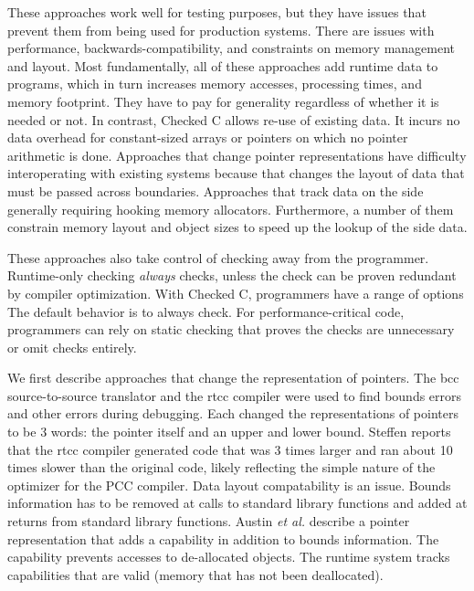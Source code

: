 These approaches work well for testing purposes, but they have issues that
prevent them from being used for production systems.  There are issues
with performance, backwards-compatibility, and constraints on memory
management and layout.  Most fundamentally, all of these approaches add
runtime data to programs, which in turn increases memory accesses, processing 
times, and memory footprint.  They have to pay for generality regardless of
whether it is needed or not. In contrast, Checked C allows re-use of existing data.
It incurs no data overhead for constant-sized arrays or pointers on which no pointer arithmetic is done.   Approaches that change
pointer representations have difficulty interoperating with existing
systems because that changes the layout of data that must be passed
across boundaries.  Approaches that track data on the side generally
requiring hooking memory allocators.  Furthermore, a number of them
constrain memory layout and object sizes to speed up the lookup of
the side data.

These approaches also take control of checking away from the programmer.
Runtime-only checking {\em always} checks, unless the check can be proven 
redundant by compiler optimization.   With Checked C, programmers have
a range of options   The default behavior is to always check. For performance-critical
code, programmers can rely on static checking that proves the checks
are unnecessary or omit checks entirely.

We first describe approaches that change the representation of pointers.
The bcc source-to-source translator \cite{Kendall1983} and the rtcc
compiler \cite{Steffen1992} were used to find bounds errors and
other errors during debugging.  Each changed the representations of pointers to be 
3 words: the pointer itself and an upper and lower bound.   
Steffen \cite{Steffen1992} reports that the rtcc compiler generated code
that was 3 times larger and ran about 10 times slower than the original code, 
likely reflecting the simple nature of  the optimizer for the PCC compiler.  Data
layout compatability is an issue.  Bounds information has to be removed at calls to
standard library  functions and added at returns from standard library functions.
Austin {\it et al.} \cite{Austin1994} describe a pointer representation that
adds a capability in addition to bounds information.  The capability prevents
accesses to de-allocated objects.  The runtime system tracks capabilities that
are valid (memory that has not been deallocated).  

